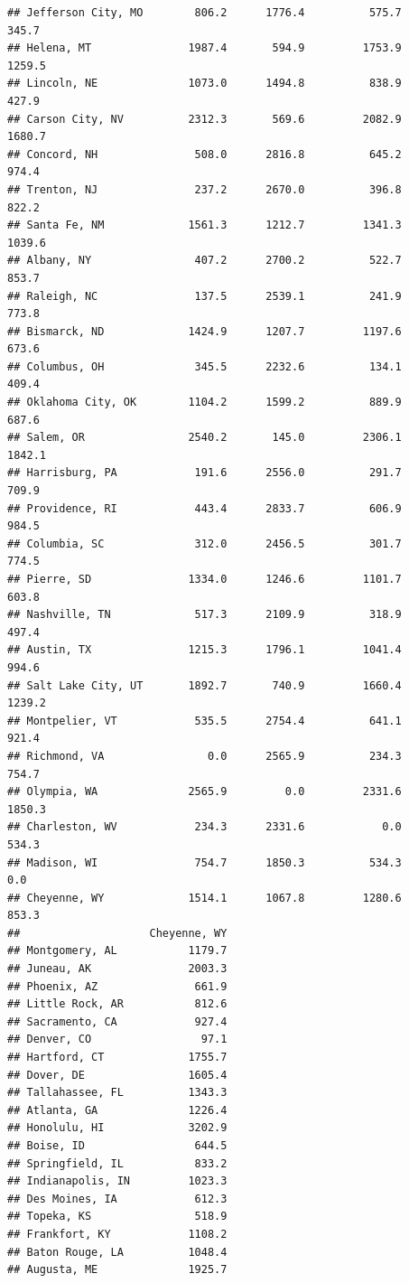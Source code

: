 \documentclass[
]{article}
\begin{document}
\begin{verbatim}
## Jefferson City, MO        806.2      1776.4          575.7       345.7
## Helena, MT               1987.4       594.9         1753.9      1259.5
## Lincoln, NE              1073.0      1494.8          838.9       427.9
## Carson City, NV          2312.3       569.6         2082.9      1680.7
## Concord, NH               508.0      2816.8          645.2       974.4
## Trenton, NJ               237.2      2670.0          396.8       822.2
## Santa Fe, NM             1561.3      1212.7         1341.3      1039.6
## Albany, NY                407.2      2700.2          522.7       853.7
## Raleigh, NC               137.5      2539.1          241.9       773.8
## Bismarck, ND             1424.9      1207.7         1197.6       673.6
## Columbus, OH              345.5      2232.6          134.1       409.4
## Oklahoma City, OK        1104.2      1599.2          889.9       687.6
## Salem, OR                2540.2       145.0         2306.1      1842.1
## Harrisburg, PA            191.6      2556.0          291.7       709.9
## Providence, RI            443.4      2833.7          606.9       984.5
## Columbia, SC              312.0      2456.5          301.7       774.5
## Pierre, SD               1334.0      1246.6         1101.7       603.8
## Nashville, TN             517.3      2109.9          318.9       497.4
## Austin, TX               1215.3      1796.1         1041.4       994.6
## Salt Lake City, UT       1892.7       740.9         1660.4      1239.2
## Montpelier, VT            535.5      2754.4          641.1       921.4
## Richmond, VA                0.0      2565.9          234.3       754.7
## Olympia, WA              2565.9         0.0         2331.6      1850.3
## Charleston, WV            234.3      2331.6            0.0       534.3
## Madison, WI               754.7      1850.3          534.3         0.0
## Cheyenne, WY             1514.1      1067.8         1280.6       853.3
##                    Cheyenne, WY
## Montgomery, AL           1179.7
## Juneau, AK               2003.3
## Phoenix, AZ               661.9
## Little Rock, AR           812.6
## Sacramento, CA            927.4
## Denver, CO                 97.1
## Hartford, CT             1755.7
## Dover, DE                1605.4
## Tallahassee, FL          1343.3
## Atlanta, GA              1226.4
## Honolulu, HI             3202.9
## Boise, ID                 644.5
## Springfield, IL           833.2
## Indianapolis, IN         1023.3
## Des Moines, IA            612.3
## Topeka, KS                518.9
## Frankfort, KY            1108.2
## Baton Rouge, LA          1048.4
## Augusta, ME              1925.7

\end{verbatim}
\end{document}
